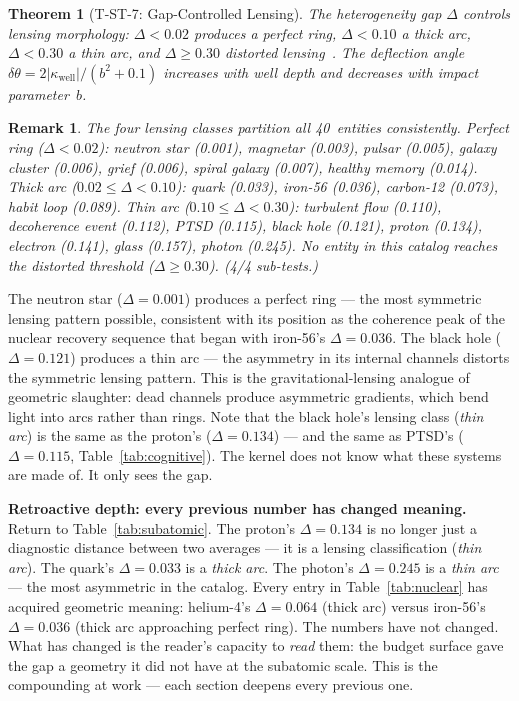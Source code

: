 \documentclass[
  aps,
  prd,
  twocolumn,
  superscriptaddress,
  nofootinbib,
  floatfix
]{revtex4-2}
\newtheorem{theorem}{Theorem}
\newtheorem{remark}{Remark}
\begin{document}
\begin{theorem}[T-ST-7: Gap-Controlled Lensing]\label{thm:T7}
The heterogeneity gap $\Delta$ controls lensing morphology:
$\Delta < 0.02$ produces a perfect ring, $\Delta < 0.10$ a
thick arc, $\Delta < 0.30$ a thin arc, and $\Delta \geq 0.30$
distorted
lensing~\cite{schneider1992gravitational,refsdal1964gravitational}.
The deflection angle
$\delta\theta = 2|\kappa_{\mathrm{well}}|/(b^2 + 0.1)$
increases with well depth and decreases with impact
parameter~$b$.
\end{theorem}

\begin{remark}
The four lensing classes partition all 40~entities
consistently.  Perfect ring ($\Delta < 0.02$): neutron star
(0.001), magnetar (0.003), pulsar (0.005), galaxy cluster
(0.006), grief (0.006), spiral galaxy (0.007), healthy memory
(0.014).  Thick arc ($0.02 \leq \Delta < 0.10$): quark (0.033),
iron-56 (0.036), carbon-12 (0.073), habit loop (0.089).
Thin arc ($0.10 \leq \Delta < 0.30$): turbulent flow (0.110),
decoherence event (0.112), PTSD (0.115), black
hole (0.121), proton (0.134), electron (0.141),
glass (0.157), photon (0.245).
No entity in this catalog reaches the distorted threshold
($\Delta \geq 0.30$).
(4/4 sub-tests.)
\end{remark}

The neutron star ($\Delta = 0.001$) produces a perfect ring ---
the most symmetric lensing pattern possible, consistent with
its position as the coherence peak of the nuclear recovery
sequence that began with iron-56's $\Delta = 0.036$.
The black hole ($\Delta = 0.121$) produces a thin arc ---
the asymmetry in its internal channels distorts the symmetric
lensing pattern.  This is the gravitational-lensing analogue
of geometric slaughter: dead channels produce asymmetric
gradients, which bend light into arcs rather than rings.
Note that the black hole's lensing class (\emph{thin arc})
is the same as the proton's ($\Delta = 0.134$) --- and
the same as PTSD's ($\Delta = 0.115$, Table~\ref{tab:cognitive}).  The
kernel does not know what these systems are made of.  It
only sees the gap.

\textbf{Retroactive depth: every previous number has changed
meaning.}
Return to Table~\ref{tab:subatomic}.  The proton's
$\Delta = 0.134$ is no longer just a diagnostic distance
between two averages --- it is a lensing classification
(\emph{thin arc}).  The quark's $\Delta = 0.033$ is a
\emph{thick arc}.  The photon's $\Delta = 0.245$ is a
\emph{thin arc} --- the most asymmetric in the catalog.  Every entry in
Table~\ref{tab:nuclear} has acquired geometric meaning:
helium-4's $\Delta = 0.064$ (thick arc) versus iron-56's
$\Delta = 0.036$ (thick arc approaching perfect ring).
The numbers have not changed.  What has changed is the reader's
capacity to \emph{read} them: the budget surface gave the gap
a geometry it did not have at the subatomic scale.  This is the
compounding at work --- each section deepens every previous one.
\end{document}
